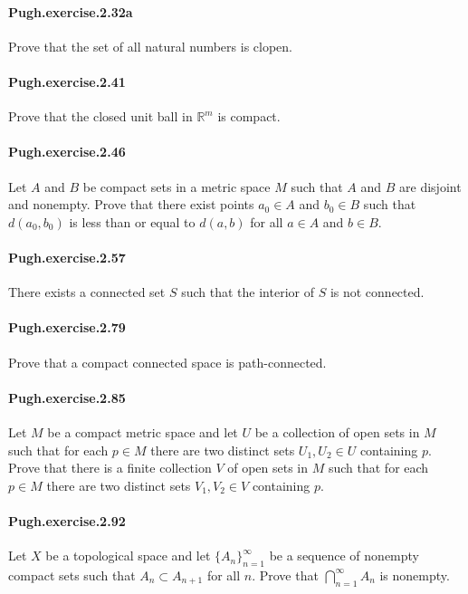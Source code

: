 \documentclass{article}
\begin{document}
\paragraph{Pugh.exercise.2.32a} Prove that the set of all natural numbers is clopen.

\paragraph{Pugh.exercise.2.41} Prove that the closed unit ball in $\mathbb{R}^m$ is compact.

\paragraph{Pugh.exercise.2.46} Let $A$ and $B$ be compact sets in a metric space $M$ such that $A$ and $B$ are disjoint and nonempty. Prove that there exist points $a_0\in A$ and $b_0\in B$ such that $d(a_0, b_0)$ is less than or equal to $d(a, b)$ for all $a\in A$ and $b\in B$.

\paragraph{Pugh.exercise.2.57} There exists a connected set $S$ such that the interior of $S$ is not connected.

\paragraph{Pugh.exercise.2.79} Prove that a compact connected space is path-connected.

\paragraph{Pugh.exercise.2.85} Let $M$ be a compact metric space and let $U$ be a collection of open sets in $M$ such that for each $p\in M$ there are two distinct sets $U_1, U_2\in U$ containing $p$. Prove that there is a finite collection $V$ of open sets in $M$ such that for each $p\in M$ there are two distinct sets $V_1, V_2\in V$ containing $p$.

\paragraph{Pugh.exercise.2.92} Let $X$ be a topological space and let $\{A_n\}_{n=1}^\infty$ be a sequence of nonempty compact sets such that $A_n\subset A_{n+1}$ for all $n$. Prove that $\bigcap_{n=1}^\infty A_n$ is nonempty.
\end{document}
